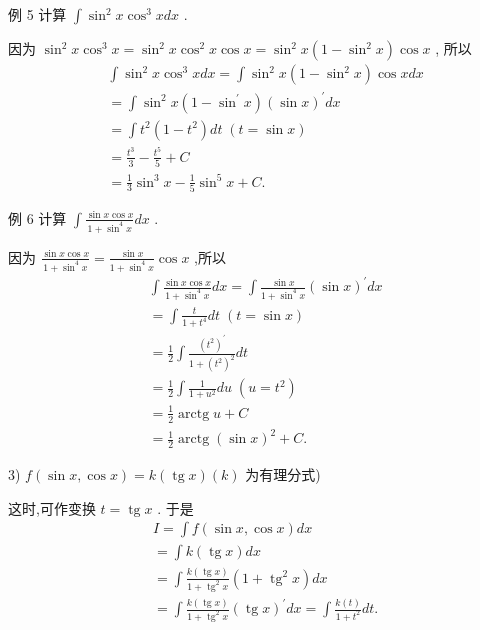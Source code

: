 例 5 计算 $\int {\sin }^{2}x{\cos }^{3}{xdx}$ .

因为 ${\sin }^{2}x{\cos }^{3}x = {\sin }^{2}x{\cos }^{2}x\cos x = {\sin }^{2}x\left( {1 - {\sin }^{2}x}\right) \cos x$ , 所以
\begin{align*}
	&\int {\sin }^{2}x{\cos }^{3}{xdx} = \int {\sin }^{2}x\left( {1 - {\sin }^{2}x}\right) \cos {xdx}\\
	&= \int {\sin }^{2}x\left( {1 - {\sin }^{\prime }x}\right) {\left( \sin x\right) }^{\prime }{dx}\\
	&= \int {t}^{2}\left( {1 - {t}^{2}}\right) {dt}\;\left( {t = \sin x}\right)\\
	&= \frac{{t}^{3}}{3} - \frac{{t}^{5}}{5} + C\\
	&= \frac{1}{3}{\sin }^{3}x - \frac{1}{5}{\sin }^{5}x + C.
\end{align*}

例 6 计算 $\int \frac{\sin x\cos x}{1 + {\sin }^{4}x}{dx}$ .

因为 $\frac{\sin x\cos x}{1 + {\sin }^{4}x} = \frac{\sin x}{1 + {\sin }^{4}x}\cos x$ ,所以
\begin{align*}
	&\int \frac{\sin x\cos x}{1 + {\sin }^{4}x}{dx} = \int \frac{\sin x}{1 + {\sin }^{4}x}{\left( \sin x\right) }^{\prime }{dx}\\
	&= \int \frac{t}{1 + {t}^{4}}{dt}\;\left( {t = \sin x}\right)\\
	&= \frac{1}{2}\int \frac{{\left( {t}^{2}\right) }^{\prime }}{1 + {\left( {t}^{2}\right) }^{2}}{dt}\\
	&= \frac{1}{2}\int \frac{1}{1 + {u}^{2}}{du}\;\left( {u = {t}^{2}}\right)\\
	&= \frac{1}{2}\operatorname{arctg}u + C\\
	&= \frac{1}{2}\operatorname{arctg}{\left( \sin x\right) }^{2} + C.
\end{align*}

3) $f\left( {\sin x,\cos x}\right)  = k\left( {\operatorname{tg}x}\right) \left( k\right)$ 为有理分式)

这时,可作变换 $t = \operatorname{tg}x$ . 于是
\begin{align*}
	&I = \int f\left( {\sin x,\cos x}\right) {dx}\\
	&= \int k\left( {\operatorname{tg}x}\right) {dx}\\
	&= \int \frac{k\left( {\operatorname{tg}x}\right) }{1 + {\operatorname{tg}}^{2}x}\left( {1 + {\operatorname{tg}}^{2}x}\right) {dx}\\
	&= \int \frac{k\left( {\operatorname{tg}x}\right) }{1 + {\operatorname{tg}}^{2}x}{\left( \operatorname{tg}x\right) }^{\prime }{dx} = \int \frac{k\left( t\right) }{1 + {t}^{2}}{dt}.
\end{align*}

